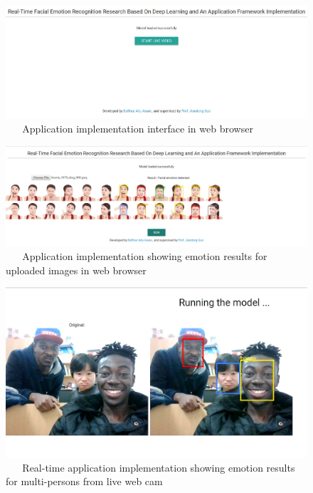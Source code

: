 \documentclass[master]{thesis-uestc}
\begin{document}
\begin{figure}[ht]
\includegraphics[width=6in]{pic/rt-interface.JPG}
\caption{\,\,\,\,\,\,\,\,\,\,Application implementation interface in web browser}
\label{rt_interface}
\end{figure}

\begin{figure}[ht]
\includegraphics[width=6in]{pic/rt-1.JPG}
\caption{\,\,\,\,\,\,\,\,\,\,Application implementation showing emotion results for uploaded images in web browser}
\label{rt_uploaded}
\end{figure}

\begin{figure}[ht]
\includegraphics[width=6in]{pic/rt-2.png}
\caption{\,\,\,\,\,\,\,\,\,\,Real-time application implementation showing emotion results for multi-persons from live web cam}
\label{rt_livecam}
\end{figure}
\end{document}
